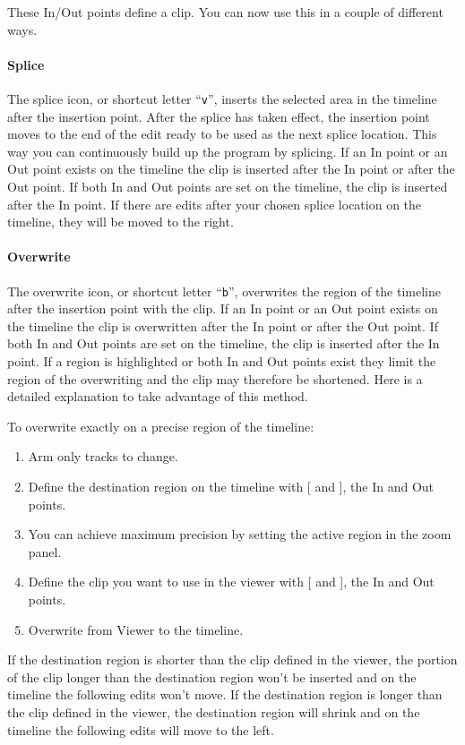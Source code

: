 \noindent These In/Out points define a clip.  You can now use this in a couple of different ways.

\paragraph{Splice} The splice icon, or shortcut letter “\texttt{v}”, inserts the selected area in the timeline after the insertion point.  After the splice has taken effect, the insertion point moves to the end of the edit ready to be used as the next splice location. This way you can continuously build up the program by splicing.
If an In point or an Out point exists on the timeline the clip is inserted after the In point or after the Out point. If both In and Out points are set on the timeline, the clip is inserted after the In point. If there are edits after your chosen splice location on the timeline, they will be moved to the right.

\paragraph{Overwrite} The overwrite icon, or shortcut letter “\texttt{b}”, overwrites the region of the timeline after the insertion point with the clip. If an In point or an Out point exists on the timeline the clip is overwritten after the In point or after the Out point. If both In and Out points are set on the timeline, the clip is inserted after the In point. If a region is highlighted or both In and Out points exist they limit the region of the overwriting and the clip may therefore be shortened. Here is a detailed explanation to take advantage of this method.

To overwrite exactly on a precise region of the timeline:

\begin{enumerate} [noitemsep]
    \item Arm only tracks to change.
    \item Define the destination region on the timeline with [ and ], the In and Out points.
    \item You can achieve maximum precision by setting the active region in the zoom panel.
    \item Define the clip you want to use in the viewer with [ and ], the In and Out points.
    \item Overwrite from Viewer to the timeline.
\end{enumerate}

If the destination region is shorter than the clip defined in the viewer, the portion of the clip longer than the destination region won't be inserted and on the timeline the following edits won't move.
If the destination region is longer than the clip defined in the viewer, the destination region will shrink and on the timeline the following edits will move to the left.

